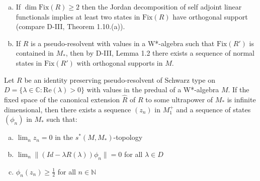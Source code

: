 \newpage

\begin{remark}\label{rem:d4-4-2}
\begin{enumerate}[(a)]
\item
If \(\dim \text{Fix}(R) \geq 2\) then the Jordan decomposition of self adjoint linear functionals implies at least two states in \(\text{Fix}(R)\) have orthogonal support (compare D-III, Theorem 1.10.(a)).

\item
If \(R\) is a pseudo-resolvent with values in a W*-algebra such that \(\text{Fix}(R')\) is contained in \(M_{*}\), then by D-III, Lemma 1.2 there exists a sequence of normal states in \(\text{Fix}(R')\) with orthogonal supports in \(M\).
\end{enumerate}
\end{remark}

\begin{lemma}\label{lem:d4-4-3}
Let \(R\) be an identity preserving pseudo-resolvent of Schwarz type on \(D = \{\lambda \in \mathbb{C}: \text{Re}(\lambda) > 0\}\) with values in the predual of a W*-algebra \(M\).
If the fixed space of the canonical extension \(\hat{R}\) of \(R\) to some ultrapower of \(M_{*}\) is infinite dimensional, then there exists a sequence \((z_{n})\) in \(M_{1}^{+}\) and a sequence of states \((\phi_{n})\) in \(M_{*}\) such that:
\begin{enumerate}[(a)]
\item
\(\lim_{n} z_{n} = 0\) in the \(s^{*}(M,M_{*})\)-topology

\item
\(\lim_{n} \|(Id - \lambda R(\lambda))\phi_{n}\| = 0\) for all \(\lambda \in D\)

\item
\(\phi_{n}(z_{n}) \geq \frac{1}{2}\) for all \(n \in \mathbb{N}\)
\end{enumerate}
\end{lemma}


